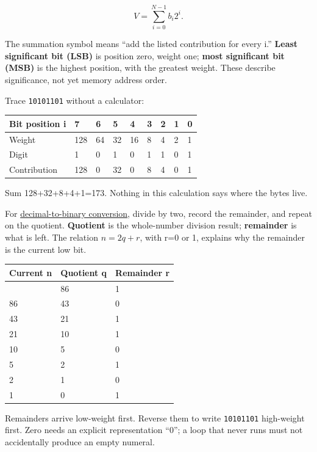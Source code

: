 \[
V=\sum_{i=0}^{N-1}b_i2^i.
\]

The summation symbol means ``add the listed contribution for every i.'' \textbf{Least significant bit (LSB)} is position zero, weight one; \textbf{most significant bit (MSB)} is the highest position, with the greatest weight. These describe significance, not yet memory address order.

Trace \texttt{10101101} without a calculator:

{\def\LTcaptype{none} %
\begin{longtable}[]{@{}lllllllll@{}}
\toprule\noalign{}
Bit position i & 7 & 6 & 5 & 4 & 3 & 2 & 1 & 0 \\
\midrule\noalign{}
\endhead
\bottomrule\noalign{}
\endlastfoot
Weight & 128 & 64 & 32 & 16 & 8 & 4 & 2 & 1 \\
Digit & 1 & 0 & 1 & 0 & 1 & 1 & 0 & 1 \\
Contribution & 128 & 0 & 32 & 0 & 8 & 4 & 0 & 1 \\
\end{longtable}
}

Sum 128+32+8+4+1=173. Nothing in this calculation says where the bytes live.

For \hyperref[appendix-dc552784a2c0]{decimal-to-binary conversion}, divide by two, record the remainder, and repeat on the quotient. \textbf{Quotient} is the whole-number division result; \textbf{remainder} is what is left. The relation \(n=2q+r\), with r=0 or 1, explains why the remainder is the current low bit.

{\def\LTcaptype{none} %
\begin{longtable}[]{@{}lll@{}}
\toprule\noalign{}
Current n & Quotient q & Remainder r \\
\midrule\noalign{}
\endhead
\bottomrule\noalign{}
\endlastfoot
173 & 86 & 1 \\
86 & 43 & 0 \\
43 & 21 & 1 \\
21 & 10 & 1 \\
10 & 5 & 0 \\
5 & 2 & 1 \\
2 & 1 & 0 \\
1 & 0 & 1 \\
\end{longtable}
}

Remainders arrive low-weight first. Reverse them to write \texttt{10101101} high-weight first. Zero needs an explicit representation ``0''; a loop that never runs must not accidentally produce an empty numeral.

